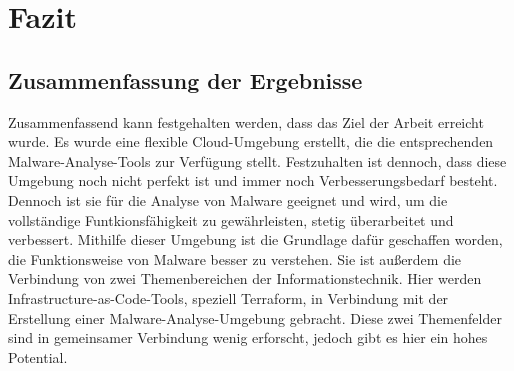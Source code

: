 \section{Fazit}
\subsection{Zusammenfassung der Ergebnisse}
Zusammenfassend kann festgehalten werden, dass das Ziel der Arbeit erreicht wurde. Es wurde eine flexible Cloud-Umgebung erstellt, die die entsprechenden Malware-Analyse-Tools zur Verfügung stellt. Festzuhalten ist dennoch, dass diese Umgebung noch nicht perfekt ist und immer noch Verbesserungsbedarf besteht. Dennoch ist sie für die Analyse von Malware geeignet und wird, um die vollständige Funtkionsfähigkeit zu gewährleisten, stetig überarbeitet und verbessert. Mithilfe dieser Umgebung ist die Grundlage dafür geschaffen worden, die Funktionsweise von Malware besser zu verstehen. Sie ist außerdem die Verbindung von zwei Themenbereichen der Informationstechnik. Hier werden Infrastructure-as-Code-Tools, speziell Terraform, in Verbindung mit der Erstellung einer Malware-Analyse-Umgebung gebracht. Diese zwei Themenfelder sind in gemeinsamer Verbindung wenig erforscht, jedoch gibt es hier ein hohes Potential. 
